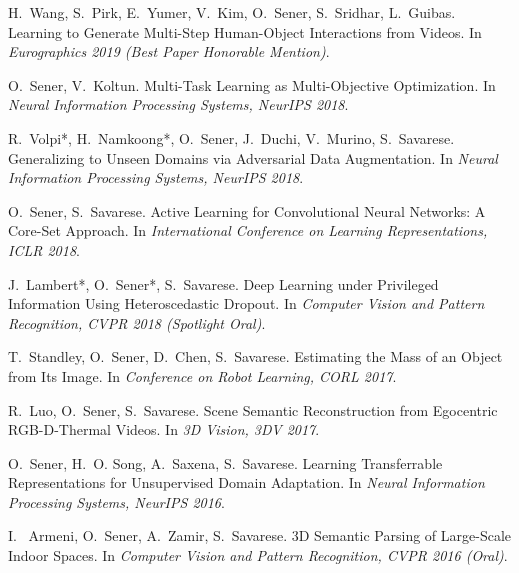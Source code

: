 H.~Wang, S.~Pirk, E.~Yumer, V.~Kim,  O.~Sener, S.~Sridhar, L.~Guibas.
\newblock Learning to Generate Multi-Step Human-Object Interactions from Videos. 
\newblock In {\em Eurographics 2019 (Best Paper Honorable Mention)}.
\vspace{-2mm}

O.~Sener, V.~Koltun.
\newblock Multi-Task Learning as Multi-Objective Optimization. 
\newblock In {\em Neural Information Processing Systems, NeurIPS 2018}.
\vspace{-2mm}

R.~Volpi*, H.~Namkoong*, O.~Sener, J.~Duchi, V.~Murino, S.~Savarese.
\newblock Generalizing to Unseen Domains via Adversarial Data Augmentation. 
\newblock In {\em Neural Information Processing Systems, NeurIPS 2018}.
\vspace{-2mm}

O.~Sener, S.~Savarese.
\newblock Active Learning for Convolutional Neural Networks: A Core-Set Approach.
\newblock In {\em International Conference on Learning Representations, ICLR 2018}.
\vspace{-2mm}

J.~Lambert*, O.~Sener*, S.~Savarese.
\newblock Deep Learning under Privileged Information Using Heteroscedastic Dropout. 
\newblock In {\em Computer Vision and Pattern Recognition, CVPR 2018 (Spotlight Oral)}.
\vspace{-2mm}



 \ifx\academictyperesume\undefined
\else
\newpage
\fi

T.~Standley, O.~Sener, D.~Chen, S.~Savarese.
\newblock Estimating the Mass of an Object from Its Image. 
\newblock In {\em Conference on Robot Learning, CORL 2017}.
\vspace{-2mm}

R.~Luo, O.~Sener, S.~Savarese.
\newblock Scene Semantic Reconstruction from Egocentric RGB-D-Thermal Videos. 
\newblock In {\em 3D Vision, 3DV 2017}.
\vspace{-2mm}

O.~Sener, H.~O. Song, A.~Saxena, S.~Savarese.
\newblock Learning Transferrable Representations for Unsupervised Domain Adaptation. 
\newblock In {\em Neural Information Processing Systems, NeurIPS 2016}.
\vspace{-2mm}

I. ~Armeni, O.~Sener, A.~Zamir, S.~Savarese.
\newblock 3D Semantic Parsing of Large-Scale Indoor Spaces.
\newblock In {\em Computer Vision and Pattern Recognition, CVPR 2016 (Oral)}.
\vspace{-2mm}

